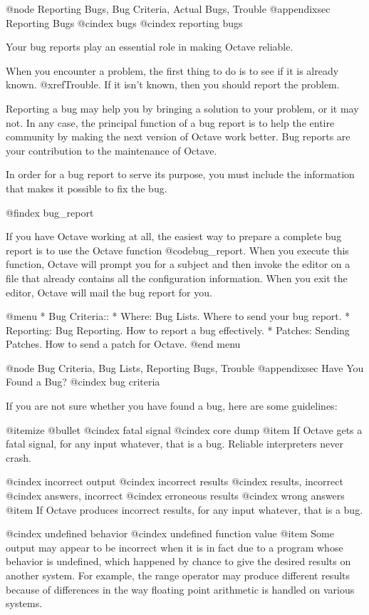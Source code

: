 @node Reporting Bugs, Bug Criteria, Actual Bugs, Trouble
@appendixsec Reporting Bugs
@cindex bugs
@cindex reporting bugs

Your bug reports play an essential role in making Octave reliable.

When you encounter a problem, the first thing to do is to see if it is
already known.  @xref{Trouble}.  If it isn't known, then you should
report the problem.

Reporting a bug may help you by bringing a solution to your problem, or
it may not.  In any case, the principal function of a bug report is
to help the entire community by making the next version of Octave work
better.  Bug reports are your contribution to the maintenance of Octave.

In order for a bug report to serve its purpose, you must include the
information that makes it possible to fix the bug.

@findex bug_report

If you have Octave working at all, the easiest way to prepare a complete
bug report is to use the Octave function @code{bug_report}.  When you
execute this function, Octave will prompt you for a subject and then
invoke the editor on a file that already contains all the configuration
information.  When you exit the editor, Octave will mail the bug report
for you.

@menu
* Bug Criteria::                
* Where: Bug Lists.             Where to send your bug report.
* Reporting: Bug Reporting.     How to report a bug effectively.
* Patches: Sending Patches.     How to send a patch for Octave.
@end menu

@node Bug Criteria, Bug Lists, Reporting Bugs, Trouble
@appendixsec Have You Found a Bug?
@cindex bug criteria

If you are not sure whether you have found a bug, here are some guidelines:

@itemize @bullet
@cindex fatal signal
@cindex core dump
@item
If Octave gets a fatal signal, for any input whatever, that is
a bug.  Reliable interpreters never crash.

@cindex incorrect output
@cindex incorrect results
@cindex results, incorrect
@cindex answers, incorrect
@cindex erroneous results
@cindex wrong answers
@item
If Octave produces incorrect results, for any input whatever,
that is a bug.

@cindex undefined behavior
@cindex undefined function value
@item
Some output may appear to be incorrect when it is in fact due to a
program whose behavior is undefined, which happened by chance to give
the desired results on another system.  For example, the range operator
may produce different results because of differences in the way floating
point arithmetic is handled on various systems.

